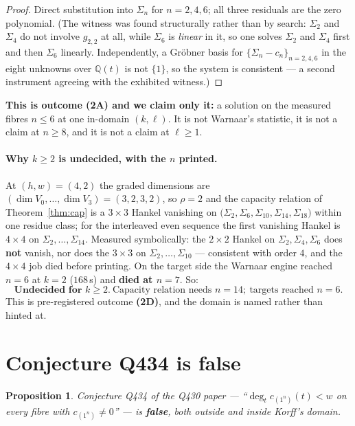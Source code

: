 \documentclass[11pt]{article}
\theoremstyle{plain}
\newtheorem{proposition}[theorem]{Proposition}
\theoremstyle{definition}
\theoremstyle{remark}
\begin{document}
\begin{proof}
Direct substitution into $\Sigma_n$ for $n=2,4,6$; all three residuals are the zero polynomial.
(The witness was found structurally rather than by search: $\Sigma_2$ and $\Sigma_4$ do not
involve $g_{2,2}$ at all, while $\Sigma_6$ is \emph{linear} in it, so one solves $\Sigma_2$ and
$\Sigma_4$ first and then $\Sigma_6$ linearly. Independently, a Gr\"obner basis for
$\{\Sigma_n-c_n\}_{n=2,4,6}$ in the eight unknowns over $\mathbb{Q}(t)$ is not $\{1\}$, so the
system is consistent --- a second instrument agreeing with the exhibited witness.)
\end{proof}

\noindent\textbf{This is outcome (2A) and we claim only it:} a solution on the measured fibres
$n\le6$ at one in-domain $(k,\ell)$. It is not Warnaar's statistic, it is not a claim at
$n\ge8$, and it is not a claim at $\ell\ge1$.

\paragraph{Why $k\ge2$ is undecided, with the $n$ printed.} At $(h,w)=(4,2)$ the graded
dimensions are $(\dim V_0,\dots,\dim V_3)=(3,2,3,2)$, so $\rho=2$ and the capacity relation of
Theorem~\ref{thm:cap} is a $3\times3$ Hankel vanishing on
$\bigl(\Sigma_2,\Sigma_6,\Sigma_{10},\Sigma_{14},\Sigma_{18}\bigr)$ within one residue class;
for the interleaved even sequence the first vanishing Hankel is $4\times4$ on
$\Sigma_2,\dots,\Sigma_{14}$. Measured symbolically: the $2\times2$ Hankel on
$\Sigma_2,\Sigma_4,\Sigma_6$ does \textbf{not} vanish, nor does the $3\times3$ on
$\Sigma_2,\dots,\Sigma_{10}$ --- consistent with order $4$, and the $4\times4$ job died before
printing. On the target side the Warnaar engine reached $n=6$ at $k=2$ ($168$\,s) and
\textbf{died at $n=7$}. So:
\[
\boxed{\ \textbf{Undecided for }k\ge2.\ \text{Capacity relation needs }n=14;\ \text{targets reached }n=6.\ }
\]
This is pre-registered outcome \textbf{(2D)}, and the domain is named rather than hinted at.

\section{Conjecture Q434 is false}\label{sec:q434}

\begin{proposition}
Conjecture Q434 of the Q430 paper --- ``$\deg_t c_{(1^n)}(t)<w$ on every fibre with
$c_{(1^n)}\neq0$'' --- is \textbf{false}, both outside and inside Korff's domain.
\end{proposition}
\end{document}
